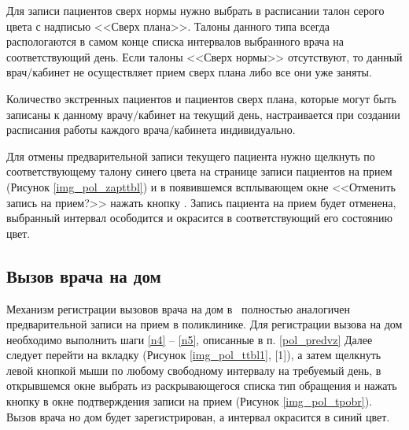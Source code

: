 Для записи пациентов сверх нормы нужно выбрать в расписании талон серого цвета с надписью <<Сверх плана>>. Талоны данного типа всегда распологаются в самом конце списка интервалов выбранного врача на соответствующий день. Если талоны <<Сверх нормы>> отсутствуют, то данный врач$\slash$кабинет не осуществляет прием сверх плана либо все они уже заняты. 

\begin{prim}
Количество экстренных пациентов и пациентов сверх плана, которые могут быть записаны к данному врачу$\slash$кабинет на текущий день, настраивается при создании расписания работы каждого врача$\slash$кабинета индивидуально. 
\end{prim}

Для отмены предварительной записи текущего пациента нужно щелкнуть по соответствующему талону синего цвета на странице записи пациентов на прием (Рисунок \ref{img_pol_zapttbl}) и в появившемся всплывающем окне <<Отменить запись на прием?>> нажать кнопку . Запись пациента на прием будет отменена, выбранный интервал осободится и окрасится в соответствующий его состоянию цвет.

\subsection{Вызов врача на дом} \label{pol_home}

Механизм регистрации вызовов врача на дом в \tmisp~полностью аналогичен предварительной записи на прием в поликлинике. Для регистрации вызова на дом необходимо выполнить шаги \ref{n4} -- \ref{n5}, описанные в п. \ref{pol_predvz} Далее следует перейти на вкладку  (Рисунок \ref{img_pol_ttbl1}, [1]), а затем щелкнуть левой кнопкой мыши по любому свободному интервалу на требуемый день, в открывшемся окне выбрать из раскрывающегося списка тип обращения и нажать кнопку  в окне подтверждения записи на прием (Рисунок \ref{img_pol_tpobr}). Вызов врача но дом будет зарегистрирован, а интервал окрасится в синий цвет.
